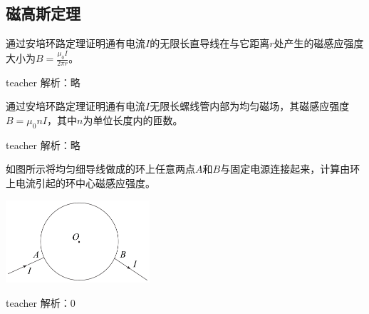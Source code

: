 \subsection{磁高斯定理}

\begin{example}
通过安培环路定理证明通有电流$I$的无限长直导线在与它距离$r$处产生的磁感应强度大小为$B=\frac{\mu_0 I}{2\pi r}$。
\begin{taggedblock}{teacher}
\newline
解析：略
\end{taggedblock}
\end{example}


\begin{example}
通过安培环路定理证明通有电流$I$无限长螺线管内部为均匀磁场，其磁感应强度$B = \mu_0 nI$，其中$n$为单位长度内的匝数。
\begin{taggedblock}{teacher}
\newline
解析：略
\end{taggedblock}
\end{example}



\begin{example}

如图所示将均匀细导线做成的环上任意两点$A$和$B$与固定电源连接起来，计算由环上电流引起的环中心磁感应强度。
\begin{flushright}
\includegraphics[width = 0.4\textwidth]{images/mag-36.pdf} 
\end{flushright}
\begin{taggedblock}{teacher}
\noindent
解析：0
\end{taggedblock}
\end{example}






%




